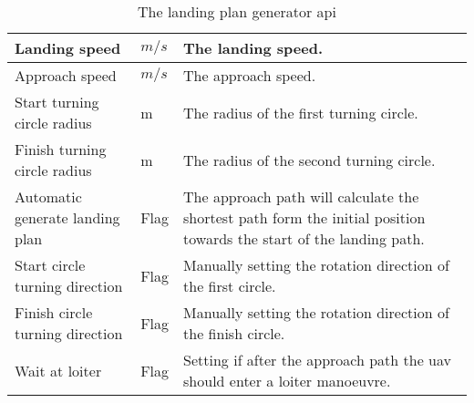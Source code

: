 \begin{table}
\begin{tabular}{| p{4cm} | p{2cm} | p{6cm} |}
Landing speed						& $m/s$			& The landing speed.	\\ \hline
Approach speed						& $m/s$			& The approach speed.	\\ \hline
Start turning circle radius			& m				& The radius of the first turning circle.	\\ \hline
Finish turning circle radius		& m				& The radius of the second turning circle.	\\ \hline
Automatic generate landing plan		& Flag			& The approach path will calculate the shortest path form the initial position towards the start of the landing path.	\\ \hline
Start circle turning direction		& Flag			& Manually setting the rotation direction of the first circle.	\\ \hline
Finish circle turning direction		& Flag			& Manually setting the rotation direction of the finish circle.	\\ \hline
Wait at loiter						& Flag			& Setting if after the approach path the \gls{uav} should enter a loiter manoeuvre.	\\ \hline
\end{tabular}
\caption{The landing plan generator \gls{api}}
\label{ApTb:LandingPlanAPI}
\end{table}
